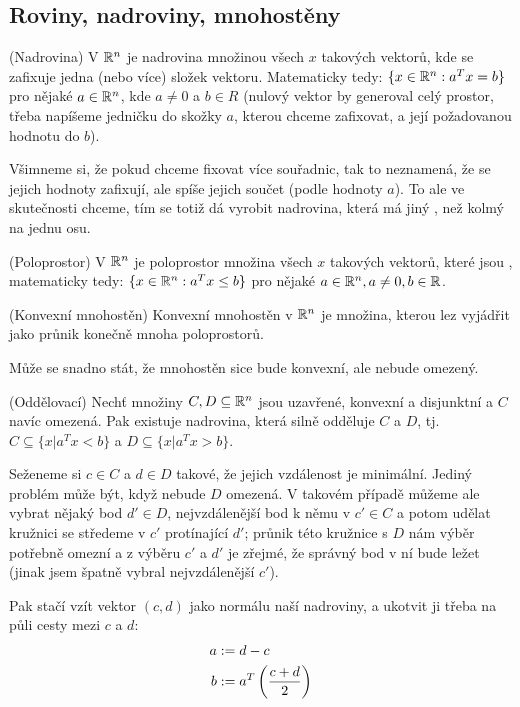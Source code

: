 \subsection{Roviny, nadroviny, mnohostěny}

\df (Nadrovina) V $\mathbb{R}^n$ je nadrovina množinou všech $x$ takových vektorů, kde
se zafixuje jedna (nebo více) složek vektoru. Matematicky tedy: $\{x \in \mathbb{R}^n:
a^Tx = b\}$ pro nějaké $a \in \mathbb{R}^n$, kde $a \neq 0$ a $b \in R$ (nulový vektor by generoval
celý prostor, třeba napíšeme jedničku do skožky $a$, kterou chceme zafixovat,
a její požadovanou hodnotu do $b$).

\poz Všimneme si, že pokud chceme fixovat více souřadnic, tak to neznamená, že
se jejich hodnoty zafixují, ale spíše jejich součet (podle hodnoty $a$). To ale
ve skutečnosti chceme, tím se totiž dá vyrobit nadrovina, která má jiný
, než kolmý na jednu osu.

\df (Poloprostor) V $\mathbb{R}^n$ je poloprostor množina všech $x$ takových vektorů,
které jsou , matematicky tedy:  $\{x \in \mathbb{R}^n:
a^Tx \leq b\}$ pro nějaké $a \in \mathbb{R}^n, a \neq 0, b \in \mathbb{R}$.

\df (Konvexní mnohostěn) Konvexní mnohostěn v $\mathbb{R}^n$ je množina, kterou lez
vyjádřit jako průnik konečně mnoha poloprostorů.

\poz Může se snadno stát, že mnohostěn sice bude konvexní, ale nebude omezený.

\vt (Oddělovací) Nechť množiny $C,D \subseteq \mathbb{R}^n$ jsou uzavřené, konvexní a disjunktní
a $C$ navíc omezená. Pak existuje nadrovina, která silně odděluje $C$ a $D$, tj.
$C \subseteq \{x | a^Tx < b\}$ a $D \subseteq \{x | a^T x > b\}$.

\dk Seženeme si $c \in C$ a $d \in D$ takové, že jejich vzdálenost je minimální.
Jediný problém může být, když nebude $D$ omezená. V takovém případě můžeme ale
vybrat nějaký bod $d'\in D$, nejvzdálenější bod k němu v $c'\in C$ a potom
udělat kružnici se středeme v $c'$ protínající $d'$; průnik této kružnice s $D$
nám výběr potřebně omezní a z výběru $c'$ a $d'$ je zřejmé, že správný bod v ní
bude ležet (jinak jsem špatně vybral nejvzdálenější $c'$).

Pak stačí vzít vektor $(c,d)$ jako normálu naší nadroviny, a ukotvit ji třeba na
půli cesty mezi $c$ a $d$:
\begin{align}
	a &:= d - c \\
	b &:= a^T\left({c+d \over 2}\right)
\end{align}


